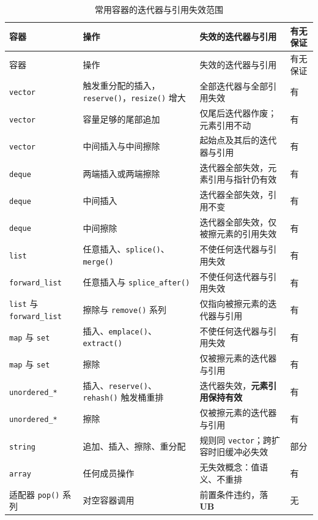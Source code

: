 \documentclass[12pt,a4paper,fontset=fandol]{ctexbook}
\newcommand{\Fn}[1]{\texttt{#1()}}
\newcommand{\Tp}[1]{\texttt{#1}}
\newcommand{\Bk}{\discretionary{}{}{}}
\newcommand{\UB}{\textbf{\textsf{UB}}}
\begin{document}
\begin{longtable}{@{}>{\raggedright\arraybackslash}p{} >{\raggedright\arraybackslash}p{} >{\raggedright\arraybackslash}p{} >{\raggedright\arraybackslash}p{}@{}}
\caption{常用容器的迭代器与引用失效范围}\label{tab:ub12-invalidation}\\
\toprule
容器 & 操作 & 失效的迭代器与引用 & 有无保证 \\
\midrule
\endfirsthead
\toprule
容器 & 操作 & 失效的迭代器与引用 & 有无保证 \\
\midrule
\endhead
\bottomrule
\endfoot
\Tp{vector} & 触发重分配的插入，\Fn{reserve}，\Fn{resize} 增大 & 全部迭代器与全部引用失效 & 有 \\
\Tp{vector} & 容量足够的尾部追加 & 仅尾后迭代器作废；元素引用不动 & 有 \\
\Tp{vector} & 中间插入与中间擦除 & 起始点及其后的迭代器与引用 & 有 \\
\Tp{deque} & 两端插入或两端擦除 & 迭代器全部失效，元素引用与指针仍有效 & 有 \\
\Tp{deque} & 中间插入 & 迭代器全部失效，引用不变 & 有 \\
\Tp{deque} & 中间擦除 & 迭代器全部失效，仅被擦元素的引用失效 & 有 \\
\Tp{list} & 任意插入、\Fn{splice}、\Fn{merge} & 不使任何迭代器与引用失效 & 有 \\
\Tp{forward{\Bk}\_list} & 任意插入与 \Fn{splice\_after} & 不使任何迭代器与引用失效 & 有 \\
\Tp{list} 与 \Tp{forward{\Bk}\_list} & 擦除与 \Fn{remove} 系列 & 仅指向被擦元素的迭代器与引用 & 有 \\
\Tp{map} 与 \Tp{set} & 插入、\Fn{emplace}、\Fn{extract} & 不使任何迭代器与引用失效 & 有 \\
\Tp{map} 与 \Tp{set} & 擦除 & 仅被擦元素的迭代器与引用 & 有 \\
\Tp{unordered{\Bk}\_*} & 插入、\Fn{reserve}、\Fn{rehash} 触发桶重排 & 迭代器失效，\textbf{元素引用保持有效} & 有 \\
\Tp{unordered{\Bk}\_*} & 擦除 & 仅被擦元素的迭代器与引用 & 有 \\
\Tp{string} & 追加、插入、擦除、重分配 & 规则同 \Tp{vector}；跨扩容时旧缓冲必失效 & 部分 \\
\Tp{array} & 任何成员操作 & 无失效概念：值语义、不重排 & 有 \\
适配器 \Fn{pop} 系列 & 对空容器调用 & 前置条件违约，落 \UB{} & 无 \\
\end{longtable}
\end{document}

